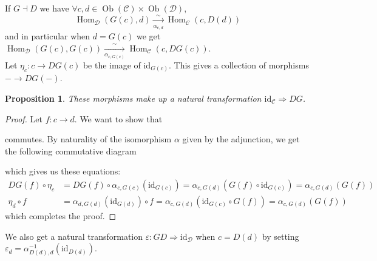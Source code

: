 \documentclass{article}
\newcommand{\id}{\mathrm{id}}
\newcommand{\cat}{\mathcal{C}}
\newcommand{\catt}{\mathcal{D}}
\DeclareMathOperator{\Ob}{Ob}
\DeclareMathOperator{\Hom}{Hom}
\renewcommand{\epsilon}{\varepsilon}
\theoremstyle{plain}
\newtheorem{proposition}[theorem]{Proposition}
\theoremstyle{definition}
\theoremstyle{remark}
\begin{document}
If $G \dashv D$ we have $\forall c,d \in \Ob(\cat)\times \Ob(\catt)$,
\[\Hom_\catt (G(c),d) \xrightarrow[\alpha_{c,d}]{\sim} \Hom_\cat (c,D(d))\]
and in particular when $d=G(c)$ we get $\Hom_\catt (G(c),G(c)) \xrightarrow[\alpha_{c,G(c)}]{\sim} \Hom_\cat (c,DG(c))$. \\
Let $\eta_c : c \to DG(c)$ be the image of $\id_{G(c)}$. This gives a collection of morphisms $- \to DG(-)$.
\begin{proposition}
    These morphisms make up a natural transformation $\id_\cat \Rightarrow DG$.
\end{proposition}
\begin{proof}
    Let $f : c\to d$. We want to show that
    \begin{center}
    \end{center}
    commutes. By naturality of the isomorphism $\alpha$ given by the adjunction, we get the following commutative diagram
    \begin{center}
    \end{center}
    which gives us these equations:
    \begin{align*}
        DG(f) \circ \eta_c & = DG(f) \circ \alpha_{c,G(c)}(\id_{G(c)}) = \alpha_{c,G(d)}(G(f)\circ \id_{G(c)}) = \alpha_{c,G(d)} (G(f)) \\
        \eta_d \circ f & = \alpha_{d,G(d)}(\id_{G(d)}) \circ f = \alpha_{c,G(d)}(\id_{G(c)} \circ G(f)) = \alpha_{c,G(d)} (G(f))
    \end{align*}
    which completes the proof.
\end{proof}

We also get a natural transformation $\epsilon : GD \Rightarrow \id_\catt$ when $c=D(d)$ by setting $\epsilon_d = \alpha_{D(d),d}^{-1}(\id_{D(d)})$.
\end{document}
